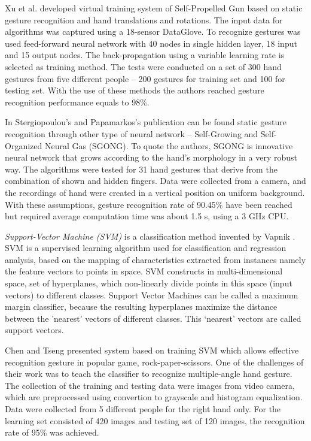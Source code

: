 Xu et al. \cite{conf/icat/XuYZ06} developed virtual training system of Self-Propelled Gun based on static gesture recognition and hand translations and rotations. The input data for algorithms was captured using a 18-sensor DataGlove. To recognize gestures was used feed-forward neural network with 40 nodes in single hidden layer, 18 input and 15 output nodes. The back-propagation using a variable learning rate is selected as training method. The tests were conducted on a set of 300 hand gestures from five different people -- 200 gestures for training set and 100 for testing set. With the use of these methods the authors reached gesture recognition performance equals to 98\%.

In Stergiopoulou’s and Papamarkos’s publication \cite{Stergiopoulou:2009:HGR:1651923.1651954} can be found static gesture recognition through other type of neural network -- Self-Growing and Self-Organized Neural Gas (SGONG). To quote the authors, SGONG is innovative neural network that grows according to the hand's morphology in a very robust way. The algorithms were tested for 31 hand gestures that derive from the combination of shown and hidden fingers. Data were collected from a camera, and the recordings of hand were created in a vertical position on uniform background. With these assumptions, gesture recognition rate of 90.45\% have been reached but required average computation time was about 1.5 s, using a 3 GHz CPU.

\emph{Support-Vector Machine (SVM)} is a classification method invented by Vapnik \cite{Cortes:SVM}. SVM is a supervised learning algorithm used for classification and regression analysis, based on the mapping of characteristics extracted from instances namely the feature vectors to points in space. SVM constructs in multi-dimensional space, set of hyperplanes, which non-linearly divide points in this space (input vectors) to different classes. Support Vector Machines can be called a maximum margin classifier, because the resulting hyperplanes maximize the distance between the ’nearest’ vectors of different classes. This ‘nearest’ vectors are called support vectors.

Chen and Tseng \cite{ChenDeveloping} presented system based on training SVM which allows effective recognition gesture in popular game, rock-paper-scissors. One of the challenges of their work was to teach the classifier to recognize multiple-angle hand gesture. The collection of the training and testing data were images from video camera, which are preprocessed using convertion to grayscale and histogram equalization. Data were collected from 5 different people for the right hand only. For the learning set consisted of 420 images and testing set of 120 images, the recognition rate of 95\% was achieved.

